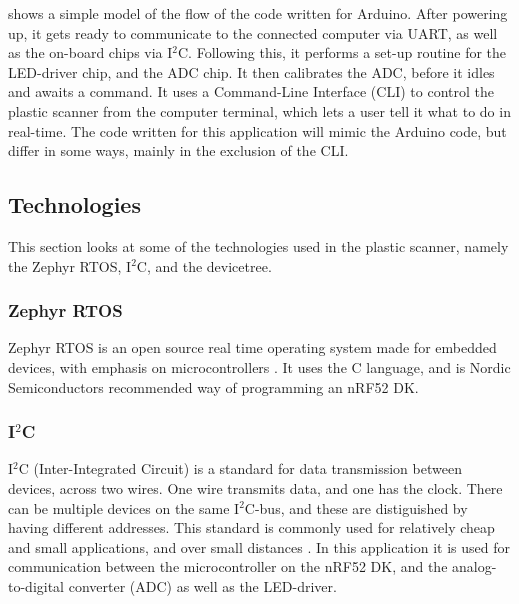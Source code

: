 \documentclass[12pt, a4paper]{article}
\begin{document}
             shows a simple model of the flow of the code written for Arduino. After powering up, it gets ready to communicate
            to the connected computer via UART, as well as the on-board chips via I$^2$C. Following this, it performs a set-up routine for the LED-driver chip,
            and the ADC chip. It then calibrates the ADC, before it idles and awaits a command. It uses a Command-Line Interface (CLI) to control the plastic
            scanner from the computer terminal, which lets a user tell it what to do in real-time. The code written for this application will mimic the Arduino
            code, but differ in some ways, mainly in the exclusion of the CLI.
            
        \subsection{Technologies}

            This section looks at some of the technologies used in the plastic scanner, namely the Zephyr RTOS,
            I$^2$C, and the devicetree.
            

            \subsubsection{Zephyr RTOS}

                Zephyr RTOS is an open source real time operating system made for embedded devices, with emphasis on microcontrollers \cite{zephyr}.
                It uses the C language, and is Nordic Semiconductors recommended way of programming an nRF52 DK. 

            \subsubsection{I$^2$C}
            
                I$^2$C (Inter-Integrated Circuit) is a standard for data transmission between devices, across two wires.
                One wire transmits data, and one has the clock. There can be multiple devices on the same I$^2$C-bus, and 
                these are distiguished by having different addresses. This standard is commonly used for relatively cheap
                and small applications, and over small distances \cite{i2c}. In this application it is used for communication between the
                microcontroller on the nRF52 DK, and the analog-to-digital converter (ADC) as well as the LED-driver.
\end{document}
